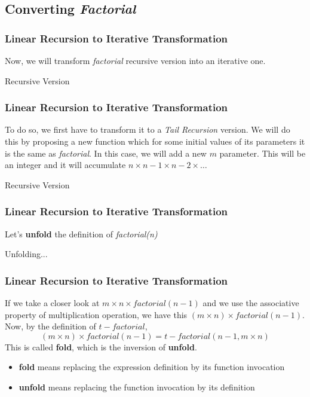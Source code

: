 \documentclass{beamer}
\begin{document}
\subsection{Converting \textit{Factorial}}
\begin{frame}
	\frametitle{Linear Recursion to Iterative Transformation}
	Now, we will transform \textit{factorial} recursive version into an iterative one.
	\begin{block}{Recursive Version}
				\begin{algorithmic}[1]
					\State{}
				\Else
					\State{}
				\EndIf
				\EndProcedure
			\end{algorithmic}
	\end{block}
\end{frame}
\begin{frame}
	\frametitle{Linear Recursion to Iterative Transformation}
	To do so, we first have to transform it to a \textit{Tail Recursion} version. We will do this by proposing a new function which for some initial values of its parameters it is the same as \textit{factorial}. In this case, we will add a new $m$ parameter. This will be an integer and it will accumulate $n\times n-1\times n-2\times \ldots$
	\begin{block}{Recursive Version}
			\begin{algorithmic}[1]
					\State{}
				\EndProcedure
			\end{algorithmic}
	\end{block}
\end{frame}
\begin{frame}
	\frametitle{Linear Recursion to Iterative Transformation}
	Let's \textbf{unfold} the definition of \textit{factorial(n)}
	\begin{block}{Unfolding...}
		\begin{algorithmic}[1]
				\State{}
			\Else
				\State{}
			\EndIf
			\EndProcedure
		\end{algorithmic}
	\end{block}
\end{frame}
\begin{frame}
	\frametitle{Linear Recursion to Iterative Transformation}
	If we take a closer look at $m \times n \times factorial(n-1)$ and we use the associative property of multiplication operation, we have this $(m\times n) \times factorial(n-1)$. Now, by the definition of $t-factorial$, 
	\begin{equation}
		(m\times n) \times factorial(n-1) = t-factorial(n-1,m \times n)
	\end{equation}
	This is called \textbf{fold}, which is the inversion of \textbf{unfold}.
	\begin{itemize}
		\item \textbf{fold} means replacing the expression definition by its function invocation
		\item \textbf{unfold} means replacing the function invocation by its definition
	\end{itemize}
\end{frame}
\end{document}
